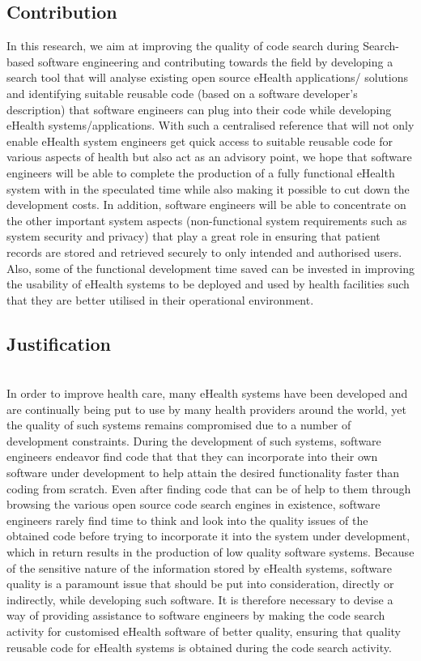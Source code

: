 \documentclass[a4paper]{article}
\begin{document}
\subsection{Contribution} \newline 
In this research, we aim at improving the quality of code search during Search-based software engineering and contributing towards the field by developing a search tool that will analyse existing open source eHealth applications/ solutions and identifying suitable reusable code (based on a software developer’s description) that software engineers can plug into their code while developing eHealth systems/applications. With such a centralised reference that will not only enable eHealth system engineers get quick access to suitable reusable code for various aspects of health but also act as an advisory point, we hope that software engineers will be able to complete the production of a fully functional eHealth system with in the speculated time while also making it possible to cut down the development costs. In addition, software engineers will be able to concentrate on the other important system aspects (non-functional system requirements such as system security and privacy) that play a great role in ensuring that patient records are stored and retrieved securely to only intended and authorised users. Also, some of the functional development time saved can be invested in improving the usability of eHealth systems to be deployed and used by health facilities such that they are better utilised in their operational environment.
\subsection{Justification}\\ 
In order to improve health care, many eHealth systems have been developed and are continually being put to use by many health providers around the world, yet the quality of such systems remains compromised due to a number of development constraints. During the development of such systems, software engineers endeavor find code that that they can incorporate into their own software under development to help attain the desired functionality faster than coding from scratch. Even after finding code that can be of help to them through browsing the various open source code search engines in existence, software engineers rarely find time to think and look into the quality issues of the obtained code before trying to incorporate it into the system under development, which in return results in the production of low quality software systems. Because of the sensitive nature of the information stored by eHealth systems, software quality is a paramount issue that should be put into consideration, directly or indirectly, while developing such software. It is therefore necessary to devise a way of providing assistance to software engineers by making the code search activity for customised eHealth software of better quality, ensuring that quality reusable code for eHealth systems is obtained during the code search activity.\\
\end{document}
